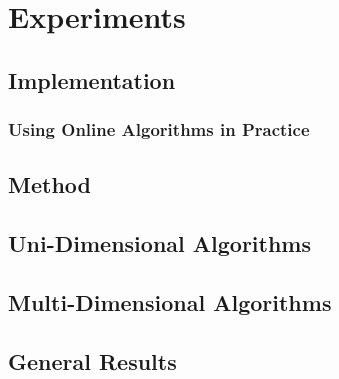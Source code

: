 
\chapter{Experiments}\label{chapter:experiments}

\section{Implementation}

\subsection{Using Online Algorithms in Practice}

\section{Method}

\section{Uni-Dimensional Algorithms}

\section{Multi-Dimensional Algorithms}

\section{General Results}
